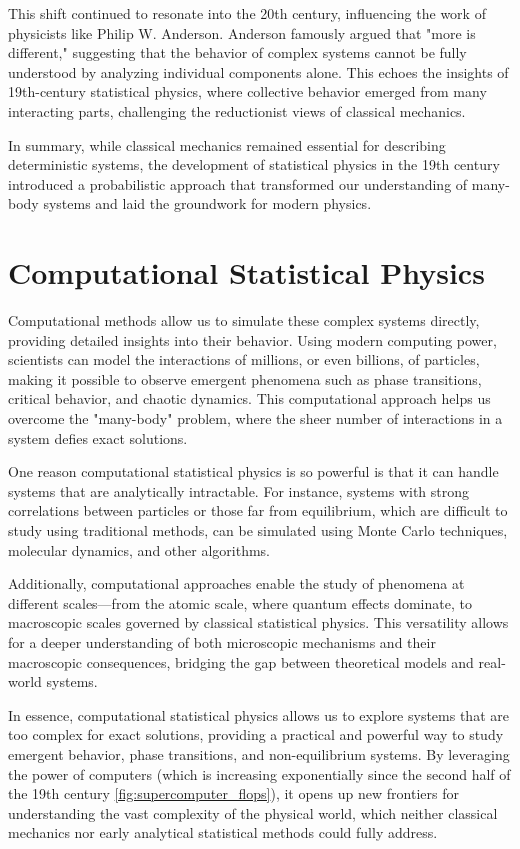 \documentclass[ansiapaper]{report}
\begin{document}
\begin{multicols}{3}
	This shift continued to resonate into the 20th century, influencing the work of physicists like Philip W. Anderson. Anderson famously argued that "more is different," suggesting that the behavior of complex systems cannot be fully understood by analyzing individual components alone. This echoes the insights of 19th-century statistical physics, where collective behavior emerged from many interacting parts, challenging the reductionist views of classical mechanics.

	In summary, while classical mechanics remained essential for describing deterministic systems, the development of statistical physics in the 19th century introduced a probabilistic approach that transformed our understanding of many-body systems and laid the groundwork for modern physics.

	\section{Computational Statistical Physics}

	Computational methods allow us to simulate these complex systems directly, providing detailed insights into their behavior. Using modern computing power, scientists can model the interactions of millions, or even billions, of particles, making it possible to observe emergent phenomena such as phase transitions, critical behavior, and chaotic dynamics. This computational approach helps us overcome the "many-body" problem, where the sheer number of interactions in a system defies exact solutions.

	One reason computational statistical physics is so powerful is that it can handle systems that are analytically intractable. For instance, systems with strong correlations between particles or those far from equilibrium, which are difficult to study using traditional methods, can be simulated using Monte Carlo techniques, molecular dynamics, and other algorithms.

	Additionally, computational approaches enable the study of phenomena at different scales—from the atomic scale, where quantum effects dominate, to macroscopic scales governed by classical statistical physics. This versatility allows for a deeper understanding of both microscopic mechanisms and their macroscopic consequences, bridging the gap between theoretical models and real-world systems.

	In essence, computational statistical physics allows us to explore systems that are too complex for exact solutions, providing a practical and powerful way to study emergent behavior, phase transitions, and non-equilibrium systems. By leveraging the power of computers (which is increasing exponentially since the second half of the 19th century \ref{fig:supercomputer_flops}), it opens up new frontiers for understanding the vast complexity of the physical world, which neither classical mechanics nor early analytical statistical methods could fully address.


\end{multicols}
\end{document}
